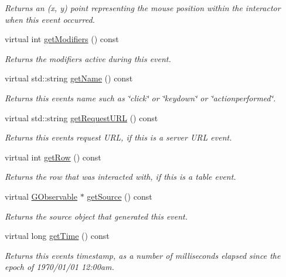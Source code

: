 \begin{DoxyCompactItemize}
\begin{DoxyCompactList}\small\item\em Returns an (x, y) point representing the mouse position within the interactor when this event occurred. \end{DoxyCompactList}\item 
virtual int \mbox{\hyperlink{classGEvent_ab8f99a1ccd9832faabeee792bc5702e2}{get\+Modifiers}} () const
\begin{DoxyCompactList}\small\item\em Returns the modifiers active during this event. \end{DoxyCompactList}\item 
virtual std\+::string \mbox{\hyperlink{classGEvent_a8a60438a5b55d0b2ceb35c8674b9d8c5}{get\+Name}} () const
\begin{DoxyCompactList}\small\item\em Returns this event\textquotesingle{}s name such as \char`\"{}click\char`\"{} or \char`\"{}keydown\char`\"{} or \char`\"{}actionperformed\char`\"{}. \end{DoxyCompactList}\item 
virtual std\+::string \mbox{\hyperlink{classGEvent_add17fc1a534941f382f2fc7970269138}{get\+Request\+U\+RL}} () const
\begin{DoxyCompactList}\small\item\em Returns this event\textquotesingle{}s request U\+RL, if this is a server U\+RL event. \end{DoxyCompactList}\item 
virtual int \mbox{\hyperlink{classGEvent_aa7d942808111bd8f4a3ec1cfcf33c6af}{get\+Row}} () const
\begin{DoxyCompactList}\small\item\em Returns the row that was interacted with, if this is a table event. \end{DoxyCompactList}\item 
virtual \mbox{\hyperlink{classGObservable}{G\+Observable}} $\ast$ \mbox{\hyperlink{classGEvent_a6a534b750e8678439ebfbeda4b2e4b26}{get\+Source}} () const
\begin{DoxyCompactList}\small\item\em Returns the source object that generated this event. \end{DoxyCompactList}\item 
virtual long \mbox{\hyperlink{classGEvent_a33358fd133be1650e22dbe230748b417}{get\+Time}} () const
\begin{DoxyCompactList}\small\item\em Returns this event\textquotesingle{}s timestamp, as a number of milliseconds elapsed since the epoch of 1970/01/01 12\+:00am. \end{DoxyCompactList}\item 

\end{DoxyCompactItemize}
